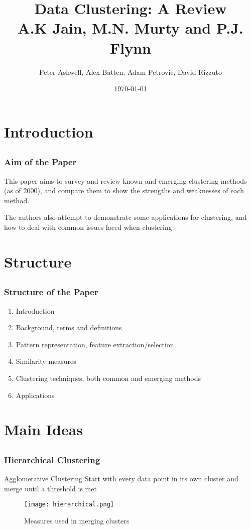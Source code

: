 \documentclass{beamer}
\title{Data Clustering: A Review\\A.K Jain, M.N. Murty and P.J. Flynn}
\author{Peter Ashwell, Alex Batten, Adam Petrovic, David Rizzuto}
\date{\today}
\begin{document}
\frame{
\titlepage
}

\section{Introduction}
    \subsection{}
        \frame
        {
            \frametitle{Aim of the Paper}
            This paper aims to survey and review known and emerging clustering methods (as of 2000), and compare them to show the strengths and weaknesses of each method.

            The authors also attempt to demonstrate some applications for clustering, and how to deal with common issues faced when clustering.
        }

\section{Structure}
    \subsection{}
        \frame
        {
            \frametitle{Structure of the Paper}
                \begin{enumerate}
                    \item Introduction
                    \item Background, terms and definitions
                    \item Pattern representation, feature extraction/selection
                    \item Similarity measures
                    \item Clustering techniques, both common and emerging methods
                    \item Applications
                \end{enumerate}
        }

\section{Main Ideas}
    \subsection{}
        \frame
        {
			\frametitle{Hierarchical Clustering}
			\begin{block}{Agglomerative Clustering}
				Start with every data point in its own cluster and merge until a threshold is met
			\end{block}
			
			\begin{figure}
				\centering
				\texttt{[image: hierarchical.png]}
				\caption{Measures used in merging clusters}
			\end{figure}
		}
\end{document}
